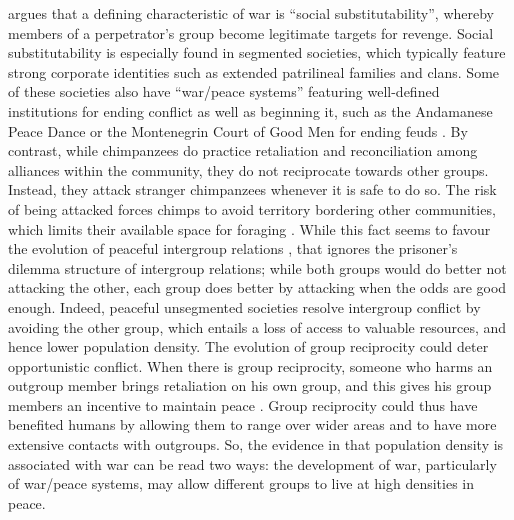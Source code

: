 \documentclass[12pt,a4paper]{article}\usepackage[]{graphicx}\usepackage[]{color}
\begin{document}
\citet{kelly2000warless} argues that a defining characteristic of war is ``social substitutability'', whereby members
of a perpetrator's group become legitimate targets for revenge. Social substitutability is especially found in segmented
societies, which typically feature strong corporate identities such as extended patrilineal families and clans. 
Some of these societies also have ``war/peace systems'' featuring well-defined institutions for ending conflict as well as beginning it, such as the Andamanese Peace Dance or the Montenegrin Court of Good Men for ending feuds 
\citep{boehm1984blood}. By 
contrast, while chimpanzees do practice retaliation and reconciliation among alliances within the community, they  do not 
reciprocate towards other groups. Instead, they attack stranger chimpanzees whenever it is safe to do so. The risk of 
being attacked forces chimps to avoid territory bordering other communities, which limits their available space for foraging 
\citep{wilson2003intergroup}. While this fact seems to favour the evolution of peaceful intergroup relations 
\citep{kelly2005evolution}, that ignores the prisoner's dilemma structure of intergroup relations; while both groups would
do better not attacking the other, each group does better by attacking when the odds are good enough. Indeed, peaceful
unsegmented societies resolve intergroup conflict by avoiding the other group, which entails a loss of access to valuable
resources, and hence lower population density. The evolution of group 
reciprocity could deter opportunistic conflict. When there is group reciprocity, someone who harms an outgroup member 
brings retaliation on his own group, and this gives his group members an incentive to maintain peace 
\citep{boehm1984blood}. Group reciprocity could thus have benefited humans by allowing them to range over wider 
areas and to have more extensive contacts with outgroups.  So, the evidence in \citet{kelly2000warless} that population 
density is associated with war can be read two ways: the development of war, particularly of war/peace systems, may 
allow different groups to live at high densities in peace.
\end{document}
